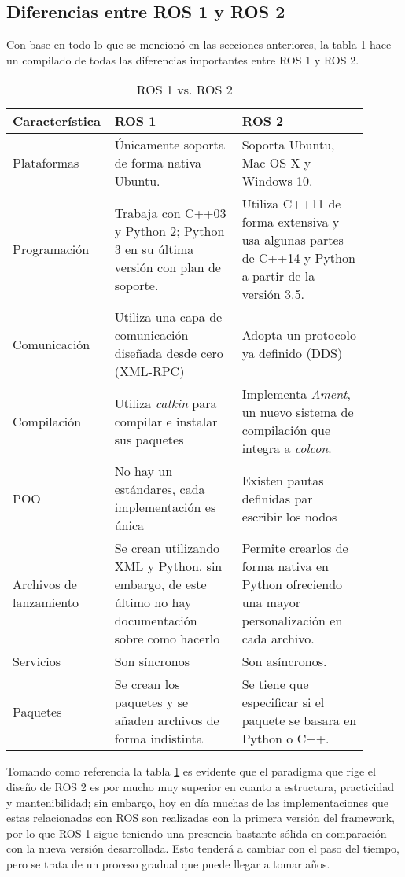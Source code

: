 \subsection{Diferencias entre ROS 1 y ROS 2}
Con base en todo lo que se mencionó en las secciones anteriores, la tabla \ref{tab:ROS1ROS2} hace un compilado de todas las diferencias importantes entre ROS 1 y ROS 2.

\begin{table}[ht]
    \centering
    \begin{tabular}{p{0.2\linewidth} p{0.35\linewidth}p{0.35\linewidth}}
        \hline
        \textbf{Característica} & \textbf{ROS 1} & \textbf{ROS 2} \\ \hline \hline
        Plataformas & Únicamente soporta de forma nativa Ubuntu. & Soporta Ubuntu, Mac OS X y Windows 10. \\ \hline
        Programación & Trabaja con C++03 y Python 2; Python 3 en su última versión con plan de soporte. & Utiliza C++11 de forma extensiva y usa algunas partes de C++14 y Python a partir de la versión 3.5.\\ \hline
        Comunicación & Utiliza una capa de comunicación diseñada desde cero (XML-RPC) & Adopta un protocolo ya definido (DDS) \\ \hline
        Compilación & Utiliza \textit{catkin} para compilar e instalar sus paquetes & Implementa \textit{Ament}, un nuevo sistema de compilación que integra a \textit{colcon}.\\ \hline
        POO & No hay un estándares, cada implementación es única & Existen pautas definidas par escribir los nodos \\ \hline
        Archivos de lanzamiento & Se crean utilizando XML y Python, sin embargo, de este último no hay documentación sobre como hacerlo & Permite crearlos de forma nativa en Python ofreciendo una mayor personalización en cada archivo. \\ \hline
        Servicios & Son síncronos & Son asíncronos. \\ \hline
        Paquetes & Se crean los paquetes y se añaden archivos de forma indistinta & Se tiene que especificar si el paquete se basara en Python o C++.\\ \hline \hline
    \end{tabular}
    \caption{ROS 1 vs. ROS 2}
    \label{tab:ROS1ROS2}
\end{table}

Tomando como referencia la tabla \ref{tab:ROS1ROS2} es evidente que el paradigma que rige el diseño de ROS 2 es por mucho muy superior en cuanto a estructura, practicidad y mantenibilidad; sin embargo, hoy en día muchas de las implementaciones que estas relacionadas con ROS son realizadas con la primera versión del framework, por lo que ROS 1 sigue teniendo una presencia bastante sólida en comparación con la nueva versión desarrollada. Esto tenderá a cambiar con el paso del tiempo, pero se trata de un proceso gradual que puede llegar a tomar años.

